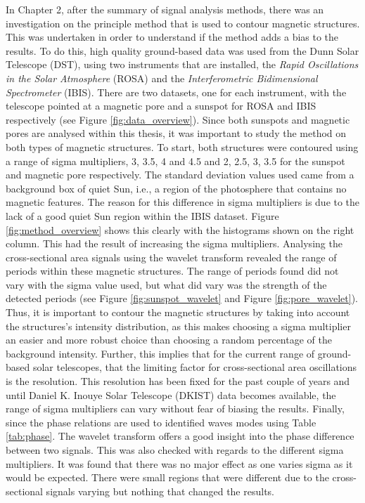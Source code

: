     In Chapter 2, after the summary of signal analysis methods, there was an investigation on the principle method that is used to contour magnetic structures.
    This was undertaken in order to understand if the method adds a bias to the results. 
    To do this, high quality ground-based data was used from the Dunn Solar Telescope (DST), using two instruments that are installed, the \textit{Rapid Oscillations in the Solar Atmosphere} (ROSA) and the \textit{Interferometric Bidimensional Spectrometer} (IBIS).
    There are two datasets, one for each instrument, with the telescope pointed at a magnetic pore and a sunspot for ROSA and IBIS respectively (see Figure \ref{fig:data_overview}).
    Since both sunspots and magnetic pores are analysed within this thesis, it was important to study the method on both types of magnetic structures.
    To start, both structures were contoured using a range of sigma multipliers, 3, 3.5, 4 and 4.5 and 2, 2.5, 3, 3.5 for the sunspot and magnetic pore respectively.
    The standard deviation values used came from a background box of quiet Sun, i.e., a region of the photosphere that contains no magnetic features.
    The reason for this difference in sigma multipliers is due to the lack of a good quiet Sun region within the IBIS dataset.
    Figure \ref{fig:method_overview} shows this clearly with the histograms shown on the right column.
    This had the result of increasing the sigma multipliers.
    Analysing the cross-sectional area signals using the wavelet transform revealed the range of periods within these magnetic structures.
    The range of periods found did not vary with the sigma value used, but what did vary was the strength of the detected periods (see Figure \ref{fig:sunspot_wavelet} and Figure \ref{fig:pore_wavelet}).
    Thus, it is important to contour the magnetic structures by taking into account the structures's intensity distribution, as this makes choosing a sigma multiplier an easier and more robust choice than choosing a random percentage of the background intensity. 
    Further, this implies that for the current range of ground-based solar telescopes, that the limiting factor for cross-sectional area oscillations is the resolution.
    This resolution has been fixed for the past couple of years and until Daniel K. Inouye Solar Telescope (DKIST) data becomes available, the range of sigma multipliers can vary without fear of biasing the results. 
    Finally, since the phase relations are used to identified waves modes using Table \ref{tab:phase}.
    The wavelet transform offers a good insight into the phase difference between two signals.
    This was also checked with regards to the different sigma multipliers.
    It was found that there was no major effect as one varies sigma as it would be expected.
    There were small regions that were different due to the cross-sectional signals varying but nothing that changed the results.
    
